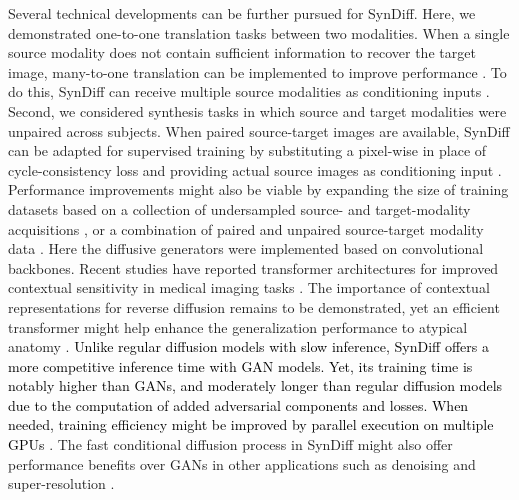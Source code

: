 \documentclass[journal,twoside,web]{ieeecolor}
\newcommand*{\revhl}{\textcolor{black}}
\begin{document}
Several technical developments can be further pursued for SynDiff. Here, we demonstrated one-to-one translation tasks between two modalities. When a single source modality does not contain sufficient information to recover the target image, many-to-one translation can be implemented to improve performance \cite{lee2019}. To do this, SynDiff can receive multiple source modalities as conditioning inputs \cite{mmgan,li2019,wang2020}. Second, we considered synthesis tasks in which source and target modalities were unpaired across subjects. When paired source-target images are available, SynDiff can be adapted for supervised training by substituting a pixel-wise in place of cycle-consistency loss and providing actual source images as conditioning input \cite{dar2019image,lyu_arxiv_2022}. Performance improvements might also be viable by expanding the size of training datasets based on a collection of undersampled source- and target-modality acquisitions \cite{yurt2021ss}, or a combination of paired and unpaired source-target modality data \cite{jin2018}. Here the diffusive generators were implemented based on convolutional backbones. Recent studies have reported transformer architectures for improved contextual sensitivity in medical imaging tasks \cite{resvit,TransGAN}. The importance of contextual representations for reverse diffusion remains to be demonstrated, yet an efficient transformer might help enhance the generalization performance to atypical anatomy \cite{slater}. \revhl{Unlike regular diffusion models with slow inference, SynDiff offers a more competitive inference time with GAN models. Yet, its training time is notably higher than GANs, and moderately longer than regular diffusion models due to the computation of added adversarial components and losses. When needed, training efficiency might be improved by parallel execution on multiple GPUs \cite{DiffNvidia}}. The fast conditional diffusion process in SynDiff might also offer performance benefits over GANs in other applications such as denoising and super-resolution \cite{denoisingmri,yang_TMI_2018,transms}. 
\end{document}
